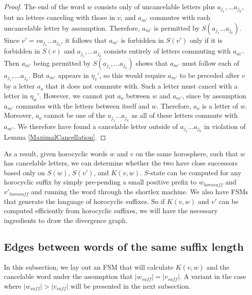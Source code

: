 \documentclass[10pt,a4paper]{amsart}
\theoremstyle{definition}
\theoremstyle{remark}
\begin{document}
\begin{proof}
		The end of the word $w$ consists only of uncancelable letters plus $a_{j_1}, ... a_{j_k}$, but no letters canceling with those in $v$, and $a_{m'}$ commutes with each uncancelable letter by assumption. Therefore, $a_{m'}$ is permitted by $S(a_{j_1}...a_{j_k})$. Since $v'=va_{j_1}...a_{j_k}$, it follows that $a_{m'}$ is forbidden in $S(v')$ only if it is forbidden in $S(v)$ and $a_{j_1}, ... a_{j_k}$ consists entirely of letters commuting with $a_{m'}$. Then $a_{m'}$ being permitted by $S(a_{j_1}, ... a_{j_k})$ shows that $a_{m'}$ must follow each of $a_{j_1}, ... a_{j_k}$. But $a_{m'}$ appears in $\eta_v'$, so this would require $a_{m'}$ to be preceded after $v$ by a letter $a_o$ that it does not commute with. Such a letter must cancel with a letter in $\eta_w'$. However, we cannot put $a_o$ between $w$ and $a_{m'}$, since by assumption $a_{m'}$ commutes with the letters between itself and $w$. Therefore, $a_o$ is a letter of $w$. Moreover, $a_o$ cannot be one of the $a_{j_1} ... a_{j_k}$ as all of these letters commute with $a_{m'}$. We therefore have found a cancelable letter outside of $a_{j_1} ... a_{j_k}$ in violation of Lemma \ref{MaximalCancellation}.
        
	\end{proof}
	
	As a result, given horocyclic words $w$ and $v$ on the same horosphere, such that $w$ has cancelable letters, we can determine whether the two have close successors based only on $S(w)$, $S(v')$, and $K(v,w)$. $S$-state can be computed for any horocyclic suffix by simply pre-pending a small positive prefix to $w_{horosuff}$ and $v'_{horosuff}$ and running the word through the shortlex machine. We also have FSMs that generate the language of horocyclic suffixes. So if $K(v,w)$ and $v'$ can be computed efficiently from horocyclic suffixes, we will have the necessary ingredients to draw the divergence graph.
	
	\subsection{Edges between words of the same suffix length}
	\label{subsec:DivergenceEdgesSameLength}
	
	In this subsection, we lay out an FSM that will calculate $K(v,w)$ and the cancelable word under the assumption that $|w_{suff}|=|v_{suff}|$. A variant in the case where $|w_{suff}|>|v_{suff}|$ will be presented in the next subsection.
	
\end{document}
